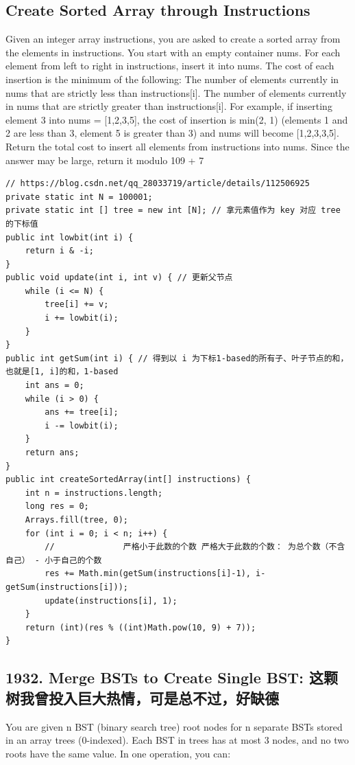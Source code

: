 \documentclass[9pt, b5paper]{article}
\begin{document}
\subsection{Create Sorted Array through Instructions}
\label{sec-8-3}
Given an integer array instructions, you are asked to create a sorted array from the elements in instructions. You start with an empty container nums. For each element from left to right in instructions, insert it into nums. The cost of each insertion is the minimum of the following:
The number of elements currently in nums that are strictly less than instructions[i].
The number of elements currently in nums that are strictly greater than instructions[i].
For example, if inserting element 3 into nums = [1,2,3,5], the cost of insertion is min(2, 1) (elements 1 and 2 are less than 3, element 5 is greater than 3) and nums will become [1,2,3,3,5].
Return the total cost to insert all elements from instructions into nums. Since the answer may be large, return it modulo 109 + 7
\begin{verbatim}
// https://blog.csdn.net/qq_28033719/article/details/112506925
private static int N = 100001;
private static int [] tree = new int [N]; // 拿元素值作为 key 对应 tree 的下标值
public int lowbit(int i) {
    return i & -i;
}
public void update(int i, int v) { // 更新父节点
    while (i <= N) {
        tree[i] += v;
        i += lowbit(i);
    }
}
public int getSum(int i) { // 得到以 i 为下标1-based的所有子、叶子节点的和， 也就是[1, i]的和，1-based
    int ans = 0;
    while (i > 0) {
        ans += tree[i];
        i -= lowbit(i);
    }
    return ans;
}
public int createSortedArray(int[] instructions) {
    int n = instructions.length;
    long res = 0;
    Arrays.fill(tree, 0);
    for (int i = 0; i < n; i++) {
        //              严格小于此数的个数 严格大于此数的个数： 为总个数（不含自己） - 小于自己的个数
        res += Math.min(getSum(instructions[i]-1), i-getSum(instructions[i])); 
        update(instructions[i], 1);
    }
    return (int)(res % ((int)Math.pow(10, 9) + 7));
}
\end{verbatim}

\subsection{1932. Merge BSTs to Create Single BST: 这颗树我曾投入巨大热情，可是总不过，好缺德}
\label{sec-8-4}
You are given n BST (binary search tree) root nodes for n separate BSTs stored in an array trees (0-indexed). Each BST in trees has at most 3 nodes, and no two roots have the same value. In one operation, you can:
\end{document}

